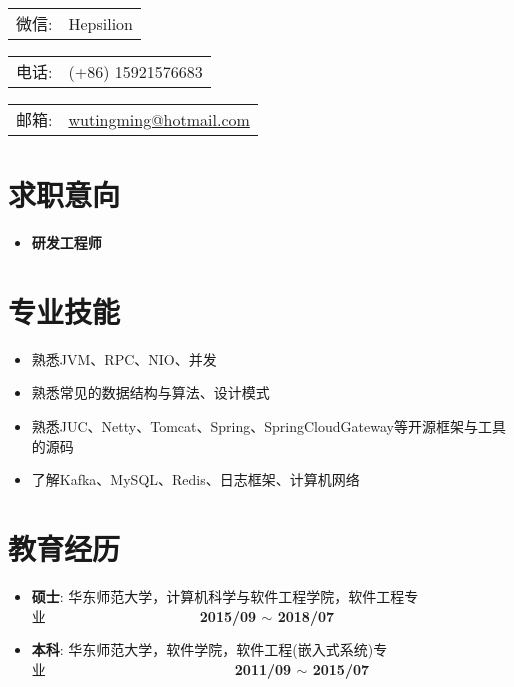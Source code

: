 \documentclass[letterpaper, UTF8, 11pt]{article}
\def\name{\textbf{\textcolor[rgb]{0.00, 0.00, 0.00}{\fontsize{30pt}{30pt}吴庭明}} ~~~~~~~~~ \fontsize{15pt}{15pt}}
\begin{document}
	
	\noindent{\bf \name} 
	\vspace{0.1in}

	\begin{minipage}{0.2\linewidth}
		\begin{tabular}{ll}
			微信:   & Hepsilion 
		\end{tabular}
	\end{minipage}
	\begin{minipage}{0.3\linewidth}
		\begin{tabular}{ll}
			电话:   & (+86) 15921576683  
		\end{tabular}
	\end{minipage}
	\begin{minipage}{0.5\linewidth}
		\begin{tabular}{ll}
			邮箱:   & \href{mailto:wutingming@hotmail.com}{ wutingming@hotmail.com} 
		\end{tabular}
	\end{minipage}
	\vspace{-0.4in}
	
	\section*{\textbf{求职意向}}\vspace{-0.1in}
	\begin{itemize}
		\item \textbf{研发工程师}
	\end{itemize}
	\vspace{-0.25in}
	
	\section*{\textbf{专业技能}}\vspace{-0.1in}
	\begin{itemize}
		\item 熟悉JVM、RPC、NIO、并发
		\item 熟悉常见的数据结构与算法、设计模式
		\item 熟悉JUC、Netty、Tomcat、Spring、SpringCloudGateway等开源框架与工具的源码
		\item 了解Kafka、MySQL、Redis、日志框架、计算机网络

	\end{itemize}
	\vspace{-0.25in}
	
	\section*{\textbf{教育经历}}\vspace{-0.1in}
	\begin{itemize}
		\item \textbf{硕士}: 华东师范大学，计算机科学与软件工程学院，软件工程专业~~~~~~~~~~~~~~~~~~~~~~\textbf{2015/09 $\sim$ 2018/07}
		\item \textbf{本科}: 华东师范大学，软件学院，软件工程(嵌入式系统)专业~~~~~~~~~~~~~~~~~~~~~~~~~~~\textbf{2011/09 $\sim$ 2015/07}
	\end{itemize}
	\vspace{-0.25in}
	
\end{document}
